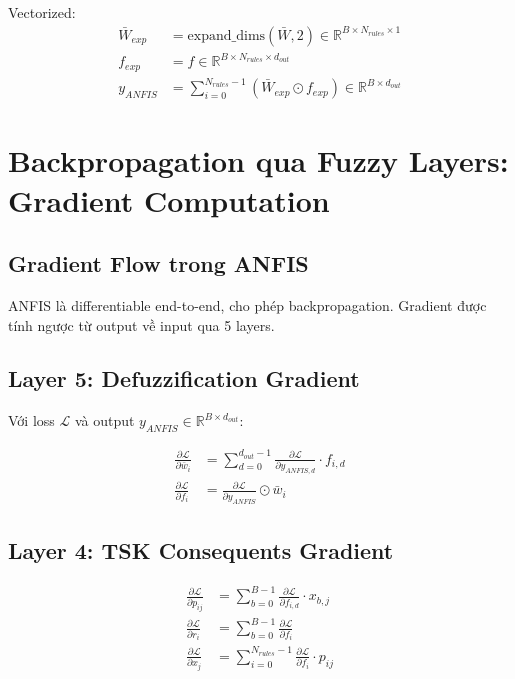 \documentclass[12pt,a4paper]{article}
\begin{document}
Vectorized:
\begin{align}
\bar{W}_{exp} &= \text{expand\_dims}(\bar{W}, 2) \in \mathbb{R}^{B \times N_{rules} \times 1} \\
f_{exp} &= f \in \mathbb{R}^{B \times N_{rules} \times d_{out}} \\
y_{ANFIS} &= \sum_{i=0}^{N_{rules}-1} (\bar{W}_{exp} \odot f_{exp}) \in \mathbb{R}^{B \times d_{out}}
\end{align}

\section{Backpropagation qua Fuzzy Layers: Gradient Computation}

\subsection{Gradient Flow trong ANFIS}

ANFIS là differentiable end-to-end, cho phép backpropagation. Gradient được tính ngược từ output về input qua 5 layers.

\subsection{Layer 5: Defuzzification Gradient}

Với loss $\mathcal{L}$ và output $y_{ANFIS} \in \mathbb{R}^{B \times d_{out}}$:

\begin{align}
\frac{\partial \mathcal{L}}{\partial \bar{w}_i} &= \sum_{d=0}^{d_{out}-1} \frac{\partial \mathcal{L}}{\partial y_{ANFIS,d}} \cdot f_{i,d} \\
\frac{\partial \mathcal{L}}{\partial f_i} &= \frac{\partial \mathcal{L}}{\partial y_{ANFIS}} \odot \bar{w}_i
\end{align}

\subsection{Layer 4: TSK Consequents Gradient}

\begin{align}
\frac{\partial \mathcal{L}}{\partial p_{ij}} &= \sum_{b=0}^{B-1} \frac{\partial \mathcal{L}}{\partial f_{i,d}} \cdot x_{b,j} \\
\frac{\partial \mathcal{L}}{\partial r_i} &= \sum_{b=0}^{B-1} \frac{\partial \mathcal{L}}{\partial f_i} \\
\frac{\partial \mathcal{L}}{\partial x_j} &= \sum_{i=0}^{N_{rules}-1} \frac{\partial \mathcal{L}}{\partial f_i} \cdot p_{ij}
\end{align}
\end{document}
